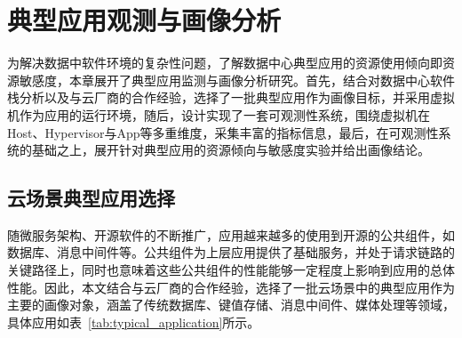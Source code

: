 \chapter{典型应用观测与画像分析}\label{chap:profiling}





为解决数据中软件环境的复杂性问题，了解数据中心典型应用的资源使用倾向即资源敏感度，本章展开了典型应用监测与画像分析研究。首先，结合对数据中心软件栈分析以及与云厂商的合作经验，选择了一批典型应用作为画像目标，并采用虚拟机作为应用的运行环境，随后，设计实现了一套可观测性系统，围绕虚拟机在Host、Hypervisor与App等多重维度，采集丰富的指标信息，最后，在可观测性系统的基础之上，展开针对典型应用的资源倾向与敏感度实验并给出画像结论。

\section{云场景典型应用选择}


随微服务架构、开源软件的不断推广，应用越来越多的使用到开源的公共组件，如数据库、消息中间件等。公共组件为上层应用提供了基础服务，并处于请求链路的关键路径上，同时也意味着这些公共组件的性能能够一定程度上影响到应用的总体性能。因此，本文结合与云厂商的合作经验，选择了一批云场景中的典型应用作为主要的画像对象，涵盖了传统数据库、键值存储、消息中间件、媒体处理等领域，具体应用如表~\ref{tab:typical_application}所示。

